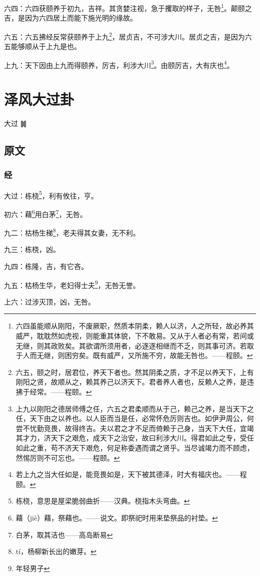 \documentclass[12pt,oneside]{book}
\begin{document}
六四：六四获颐养于初九，吉祥。其贪婪注视，急于攫取的样子，无咎\footnote{六四虽能顺从刚阳，不废厥职，然质本阴柔，赖人以济，人之所轻，故必养其威严，耽耽然如虎视，则能重其体貌，下不敢易。又从于人者必有常，若间或无继，则其政败矣。其欲谓所须用者，必逐逐相继而不乏，则其事可济。若取于人而无继，则困穷矣。既有威严，又所施不穷，故能无咎也。——程颐。}。颠颐之吉，是因为六四居上而能下施光明的缘故。

六五：六五拂经反常获颐养于上九\footnote{六五，颐之时，居君位，养天下者也。然其阴柔之质，才不足以养天下，上有刚阳之贤，故顺从之，赖其养己以济天下。君者养人者也，反赖人之养，是违拂于经常。——程颐。}，居贞吉，不可涉大川。居贞之吉，是因为六五能够顺从于上九是也。

上九：天下因由上九而得颐养，厉吉，利涉大川\footnote{上九以刚阳之德居师傅之任，六五之君柔顺而从于己，赖己之养，是当天下之任，天下由之以养也。以人臣而当是任，必常怀危厉则吉也。如伊尹周公，何尝不忧勤竞畏，故得终吉。夫以君之才不足而倚赖于己身，当天下大任，宜竭其才力，济天下之艰危，成天下之治安，故曰利涉大川。得君如此之专，受任如此之重，苟不济天下艰危，何足称委遇而谓之贤乎。当尽诚竭力而不顾虑，然惕厉则不可忘也。——程颐。}。由颐厉吉，大有庆也\footnote{若上九之当大任如是，能竞畏如是，天下被其德泽，时大有福庆也。——程颐。}。



\chapter{泽风大过卦}
大过 {\Large ䷛}

\section{原文}

\subsection{经}
大过：栋桡\footnote{栋桡，意思是屋梁脆弱曲折——汉典。桡指木头弯曲。}，利有攸往，亨。

初六：藉\footnote{藉（jiè）藉，祭藉也。——说文。即祭祀时用来垫祭品的衬垫。}用白茅\footnote{白茅，取其洁也——高岛断易}，无咎。

九二：枯杨生稊\footnote{tí，杨柳新长出的嫩芽。}，老夫得其女妻，无不利。

九三：栋桡，凶。

九四：栋隆，吉，有它吝。

九五：枯杨生华，老妇得士夫\footnote{年轻男子}，无咎无誉。

上六：过涉灭顶，凶，无咎。
\end{document}
